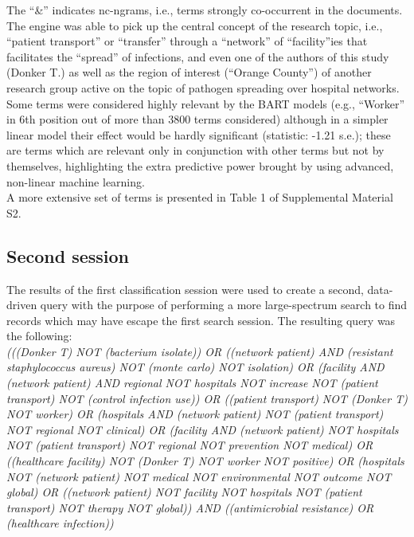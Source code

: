 \documentclass{article}
\begin{document}
The ``\&'' indicates nc-ngrams, i.e., terms strongly co-occurrent in the
documents.\\
The engine was able to pick up the central concept of the research
topic, i.e., ``patient transport'' or ``transfer'' through a ``network''
of ``facility''ies that facilitates the ``spread'' of infections, and
even one of the authors of this study (Donker T.) as well as the region
of interest (``Orange County'') of another research group active on the
topic of pathogen spreading over hospital networks. Some terms were
considered highly relevant by the BART models (e.g., ``Worker'' in 6th
position out of more than 3800 terms considered) although in a simpler
linear model their effect would be hardly significant (statistic: -1.21
s.e.); these are terms which are relevant only in conjunction with other
terms but not by themselves, highlighting the extra predictive power
brought by using advanced, non-linear machine learning.\\
A more extensive set of terms is presented in Table 1 of Supplemental
Material S2.

\hypertarget{second-session}{%
\subsection{Second session}\label{second-session}}

The results of the first classification session were used to create a
second, data-driven query with the purpose of performing a more
large-spectrum search to find records which may have escape the first
search session. The resulting query was the following:\\

\emph{(((Donker T) NOT (bacterium isolate)) OR ((network patient) AND
(resistant staphylococcus aureus) NOT (monte carlo) NOT isolation) OR
(facility AND (network patient) AND regional NOT hospitals NOT increase
NOT (patient transport) NOT (control infection use)) OR ((patient
transport) NOT (Donker T) NOT worker) OR (hospitals AND (network
patient) NOT (patient transport) NOT regional NOT clinical) OR (facility
AND (network patient) NOT hospitals NOT (patient transport) NOT regional
NOT prevention NOT medical) OR ((healthcare facility) NOT (Donker T) NOT
worker NOT positive) OR (hospitals NOT (network patient) NOT medical NOT
environmental NOT outcome NOT global) OR ((network patient) NOT facility
NOT hospitals NOT (patient transport) NOT therapy NOT global)) AND
((antimicrobial resistance) OR (healthcare infection))}
\end{document}
